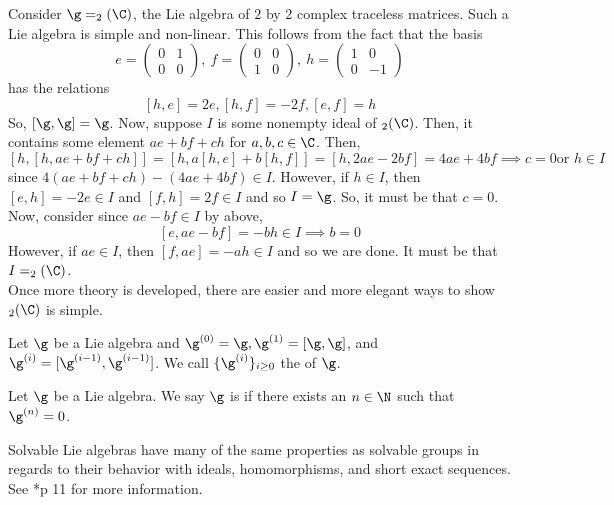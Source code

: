 \documentclass[11pt,leqno,oneside]{amsart}
\numberwithin{thm}{section}
\begin{document}
\begin{example}
  Consider \(\g = \sl_2(\C)\), the Lie algebra of \(2\) by \(2\)
  complex traceless matrices. Such a Lie algebra is simple and
  non-linear. This follows from the fact that the basis \[
    e = \left(
      \begin{array}{cc}
        0&1\\
        0&0
      \end{array}
  \right), \ f = \left(
  \begin{array}{cc}
    0&0\\
    1&0
  \end{array}
  \right), \ h = \left(
  \begin{array}{cc}
    1&0\\
    0&-1
  \end{array}
  \right)
  \]
  has the relations \[
    [h,e] = 2e, [h,f] = -2f, [e,f] = h 
  \]
  So, \([\g,\g] = \g\). Now, suppose \(I\) is some nonempty ideal of
  \(\sl_2(\C)\). Then, it contains some element \(ae+bf+ch\) for
  \(a,b,c \in \C\). Then, \[
    [h,[h,ae+bf+ch]] = [h,a[h,e] + b[h,f]] = [h,2ae - 2bf] = 4ae+4bf \implies c = 0 \text{
      or } h \in I
  \]
  since \(4(ae+bf+ch)-(4ae+4bf) \in I\). However, if \(h \in I\), then
  \([e,h] = -2e \in I\) and \([f,h] = 2f \in I\) and so \(I =
  \g\). So, it must be that \(c = 0\). Now, consider since \(ae-bf \in
  I\) by above, \[
    [e,ae-bf] = -bh \in I \implies b = 0
  \]
  However, if \(ae \in I\), then \([f,ae] = -ah \in I\) and so we are
  done. It must be that \(I = \sl_2(\C)\). \\

  Once more theory is developed, there are easier and more elegant
  ways to show \(\sl_2(\C)\) is simple.
\end{example}
\begin{defn}
  Let \(\g\) be a Lie algebra and \(\g^{(0)} = \g, \g^{(1)} =
  [\g,\g]\), and \(\g^{(i)} = 
  [\g^{(i-1)}, \g^{(i-1)}]\). We call \(\{\g^{(i)}\}_{i \geq 0}\) the
   of \(\g\). 
\end{defn}
\begin{defn}
  Let \(\g\) be a Lie algebra. We say \(\g\) is  if there
  exists an \(n \in \N\) such that \(\g^{(n)} = 0\). 
\end{defn}
Solvable Lie algebras have many of the same properties as solvable
groups in regards to their behavior with ideals, homomorphisms, and
short exact sequences. See \cite{humph}*{p 11} for more information.
\end{document}
